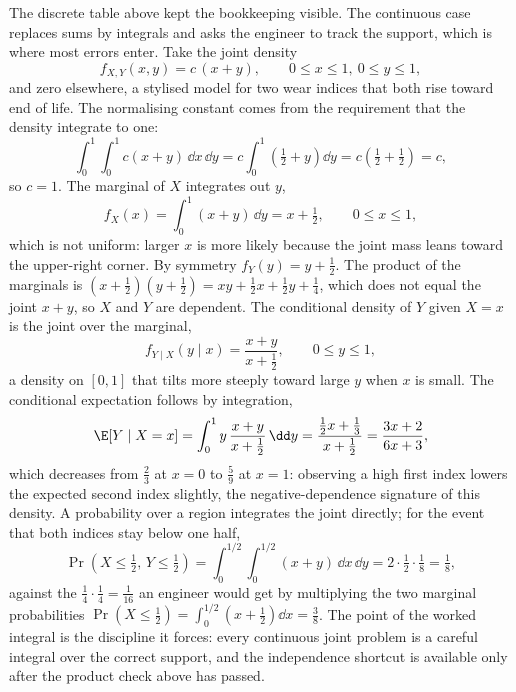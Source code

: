 The discrete table above kept the bookkeeping visible. The continuous
case replaces sums by integrals and asks the engineer to track the
support, which is where most errors enter. Take the joint density
\[
f_{X, Y}(x, y) = c\,(x + y), \qquad 0 \leq x \leq 1,\ 0 \leq y \leq 1,
\]
and zero elsewhere, a stylised model for two wear indices that both
rise toward end of life. The normalising constant comes from the
requirement that the density integrate to one:
\[
\int_{0}^{1}\!\!\int_{0}^{1} c(x + y)\,\dd x\,\dd y
= c \int_{0}^{1}\left( \tfrac12 + y \right)\dd y
= c \left( \tfrac12 + \tfrac12 \right) = c,
\]
so $c = 1$. The marginal of $X$ integrates out $y$,
\[
f_{X}(x) = \int_{0}^{1} (x + y)\,\dd y = x + \tfrac12,
\qquad 0 \leq x \leq 1,
\]
which is not uniform: larger $x$ is more likely because the joint
mass leans toward the upper-right corner. By symmetry $f_{Y}(y) = y +
\tfrac12$. The product of the marginals is $(x + \tfrac12)(y +
\tfrac12) = xy + \tfrac12 x + \tfrac12 y + \tfrac14$, which does not
equal the joint $x + y$, so $X$ and $Y$ are dependent. The conditional
density of $Y$ given $X = x$ is the joint over the marginal,
\[
f_{Y \mid X}(y \mid x) = \frac{x + y}{x + \tfrac12},
\qquad 0 \leq y \leq 1,
\]
a density on $[0, 1]$ that tilts more steeply toward large $y$ when
$x$ is small. The conditional expectation follows by integration,
\[
\E[Y \mid X = x] = \int_{0}^{1} y\,\frac{x + y}{x + \tfrac12}\,\dd y
= \frac{\tfrac12 x + \tfrac13}{x + \tfrac12}
= \frac{3x + 2}{6x + 3},
\]
which decreases from $\tfrac23$ at $x = 0$ to $\tfrac59$ at $x = 1$:
observing a high first index lowers the expected second index slightly,
the negative-dependence signature of this density. A probability over
a region integrates the joint directly; for the event that both
indices stay below one half,
\[
\Pr\!\left(X \leq \tfrac12,\, Y \leq \tfrac12\right)
= \int_{0}^{1/2}\!\!\int_{0}^{1/2} (x + y)\,\dd x\,\dd y
= 2 \cdot \tfrac12 \cdot \tfrac18 = \tfrac18,
\]
against the $\tfrac14 \cdot \tfrac14 = \tfrac1{16}$ an engineer would
get by multiplying the two marginal probabilities $\Pr(X \leq
\tfrac12) = \int_{0}^{1/2}(x + \tfrac12)\dd x = \tfrac38$. The point
of the worked integral is the discipline it forces: every continuous
joint problem is a careful integral over the correct support, and the
independence shortcut is available only after the product check above
has passed.

